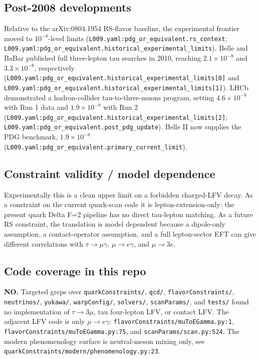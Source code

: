 \subsection*{Post-2008 developments}
Relative to the arXiv:0804.1954 RS-flavor baseline, the experimental
frontier moved to \(10^{-8}\)-level limits
(\texttt{L009.yaml:pdg\_or\_equivalent.rs\_context};
\texttt{L009.yaml:pdg\_or\_equivalent.historical\_experimental\_limits}).  Belle
and BaBar published full three-lepton tau searches in 2010, reaching
\(2.1\times 10^{-8}\) and \(3.3\times 10^{-8}\), respectively
(\texttt{L009.yaml:pdg\_or\_equivalent.historical\_experimental\_limits[0]} and
\texttt{L009.yaml:pdg\_or\_equivalent.historical\_experimental\_limits[1]}).
LHCb demonstrated a hadron-collider tau-to-three-muons program, setting
\(4.6\times 10^{-8}\) with Run 1 data and \(1.9\times 10^{-8}\) with Run 2
(\texttt{L009.yaml:pdg\_or\_equivalent.historical\_experimental\_limits[2]};
\texttt{L009.yaml:pdg\_or\_equivalent.post\_pdg\_update}).  Belle II now
supplies the PDG benchmark, \(1.9\times 10^{-8}\)
(\texttt{L009.yaml:pdg\_or\_equivalent.primary\_current\_limit}).

\subsection*{Constraint validity / model dependence}
Experimentally this is a clean upper limit on a forbidden charged-LFV decay.
As a constraint on the current quark-scan code it is lepton-extension-only:
the present quark Delta F=2 pipeline has no direct tau-lepton matching.  As a
future RS constraint, the translation is model dependent because a dipole-only
assumption, a contact-operator assumption, and a full lepton-sector EFT can
give different correlations with \(\tau\to\mu\gamma\), \(\mu\to e\gamma\), and
\(\mu\to 3e\).

\subsection*{Code coverage in this repo}
\textbf{NO.}  Targeted greps over \texttt{quarkConstraints/},
\texttt{qcd/}, \texttt{flavorConstraints/}, \texttt{neutrinos/},
\texttt{yukawa/}, \texttt{warpConfig/}, \texttt{solvers/},
\texttt{scanParams/}, and \texttt{tests/} found no implementation of
\(\tau\to3\mu\), tau four-lepton LFV, or contact LFV.  The adjacent LFV code is
only \(\mu\to e\gamma\): \texttt{flavorConstraints/muToEGamma.py:1},
\texttt{flavorConstraints/muToEGamma.py:75}, and \texttt{scanParams/scan.py:524}.
The modern phenomenology surface is neutral-meson mixing only, see
\texttt{quarkConstraints/modern/phenomenology.py:23}.

